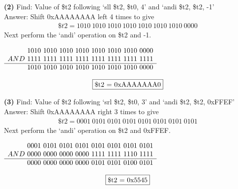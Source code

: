 \documentclass[11pt]{article}
\renewcommand\part[1]{\vspace{.10in}\textbf{(#1)}}
\newenvironment{centermath}
 {\begin{center}$\displaystyle}
 {$\end{center}}
\begin{document}
\part{2}
Find: Value of \$t2 following `sll \$t2, \$t0, 4' and `andi \$t2, \$t2, -1' \\
\vspace{5mm}
Answer: Shift 0xAAAAAAAA left 4 times to give
\begin{gather*}
\$t2 = 1010 \ 1010 \ 1010 \ 1010 \ 1010 \ 1010 \ 1010 \ 0000
\end{gather*}
Next perform the `andi' operation on \$t2 and -1. \\
\vspace{5mm}
\begin{centermath}
\begin{array}[t]{r}
    1010 \ 1010 \ 1010 \ 1010 \ 1010 \ 1010 \ 1010 \ 0000 \\
AND \ 1111\ 1111\ 1111\ 1111\ 1111\ 1111\ 1111\ 1111 \\ \hline
   \ 1010\ 1010\ 1010\ 1010\ 1010\ 1010\ 1010\ 0000
\end{array} 
\end{centermath}
\begin{gather*}
\fbox{\$t2 = 0xAAAAAAA0}
\end{gather*}

\part{3}
Find: Value of \$t2 following `srl \$t2, \$t0, 3' and `andi \$t2, \$t2, 0xFFEF' \\
\vspace{5mm}
Answer: Shift 0xAAAAAAAA right 3 times to give
\begin{gather*}
\$t2 = 0001 \ 0101 \ 0101 \ 0101 \ 0101 \ 0101 \ 0101 \ 0101
\end{gather*}
Next perform the `andi' operation on \$t2 and 0xFFEF. \\
\vspace{5mm}
\begin{centermath}
\begin{array}[t]{r}
    0001 \ 0101 \ 0101 \ 0101 \ 0101 \ 0101 \ 0101 \ 0101 \\
AND \ 0000\ 0000\ 0000\ 0000\ 1111\ 1111\ 1110\ 1111 \\ \hline
   \ 0000\ 0000\ 0000\ 0000\ 0101\ 0101\ 0100\ 0101
\end{array} 
\end{centermath}
\begin{gather*}
\fbox{\$t2 = 0x5545}
\end{gather*}
\end{document}
